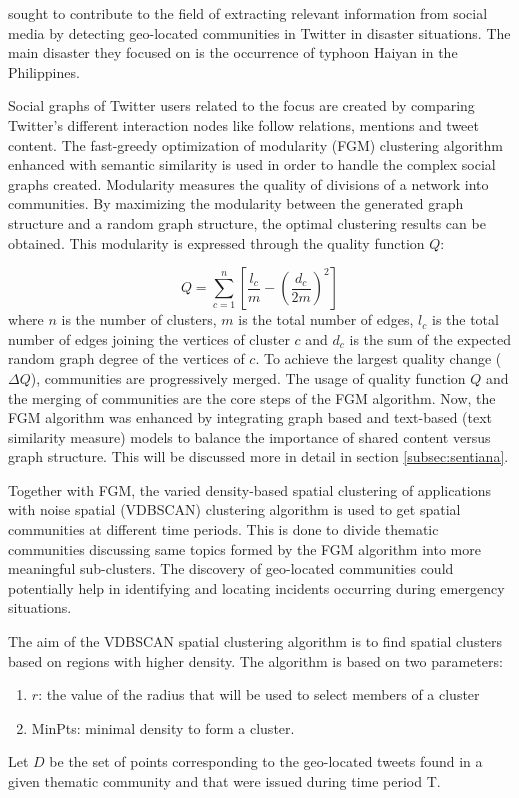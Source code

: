  sought to contribute to the field of extracting relevant information from social media by detecting geo-located communities in Twitter in disaster situations. The main disaster they focused on is the occurrence of typhoon Haiyan in the Philippines. 

Social graphs of Twitter users related to the focus are created by comparing Twitter's different interaction nodes like follow relations, mentions and tweet content. The fast-greedy optimization of modularity (FGM) clustering algorithm enhanced with semantic similarity is used in order to handle the complex social graphs created. Modularity measures the quality of divisions of a network into communities. By maximizing the modularity between the generated graph structure and a random graph structure, the optimal clustering results can be obtained. This modularity is expressed through the quality function $Q$:

\begin{equation}
Q = \sum_{c = 1}^{n} \left [ \frac{l_c}{m} - \left (\frac{d_c}{2m} \right )^2 \right ]
\end{equation}where $n$ is the number of clusters, $m$ is the total number of edges, $l_c$ is the total number of edges joining the vertices of cluster $c$ and $d_c$ is the sum of the expected random graph degree of the vertices of $c$. To achieve the largest quality change ($\Delta$$Q$), communities are progressively merged. The usage of quality function $Q$ and the merging of communities are the core steps of the FGM algorithm. Now, the FGM algorithm was enhanced by integrating graph based and text-based (text similarity measure) models to balance the importance of shared content versus graph structure. This will be discussed more in detail in section \ref{subsec:sentiana}.

Together with FGM, the varied density-based spatial clustering of applications with noise spatial (VDBSCAN) clustering algorithm is used to get spatial communities at different time periods. This is done to divide thematic communities discussing same topics formed by the FGM algorithm into more meaningful sub-clusters. The discovery of geo-located communities could potentially help in identifying and locating incidents occurring during emergency situations.

The aim of the VDBSCAN spatial clustering algorithm is to find spatial clusters based on regions with higher density. The algorithm is based on two parameters:
\begin{enumerate}
	\item $r$: the value of the radius that will be used to select members of a cluster
	\item MinPts: minimal density to form a cluster.
\end{enumerate}
Let $D$ be the set of points corresponding to the geo-located tweets found in a given thematic community and that were issued during time period T.


